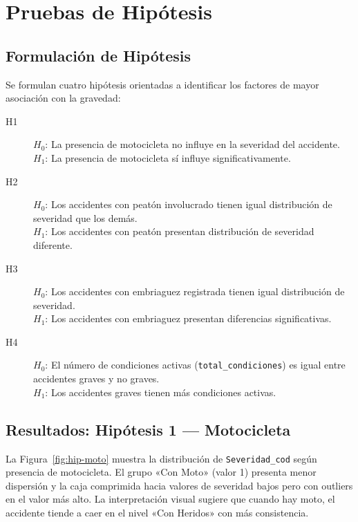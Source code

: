 \documentclass[11pt,a4paper]{article}
\begin{document}
\section{Pruebas de Hipótesis}

\subsection{Formulación de Hipótesis}

Se formulan cuatro hipótesis orientadas a identificar los factores de mayor asociación con
la gravedad:

\begin{description}
  \item[H1] $H_0$: La presencia de motocicleta no influye en la severidad del accidente.\\
            $H_1$: La presencia de motocicleta sí influye significativamente.
  \item[H2] $H_0$: Los accidentes con peatón involucrado tienen igual distribución de
            severidad que los demás.\\
            $H_1$: Los accidentes con peatón presentan distribución de severidad diferente.
  \item[H3] $H_0$: Los accidentes con embriaguez registrada tienen igual distribución de
            severidad.\\
            $H_1$: Los accidentes con embriaguez presentan diferencias significativas.
  \item[H4] $H_0$: El número de condiciones activas (\texttt{total\_condiciones}) es igual
            entre accidentes graves y no graves.\\
            $H_1$: Los accidentes graves tienen más condiciones activas.
\end{description}

\subsection{Resultados: Hipótesis 1 --- Motocicleta}

La Figura~\ref{fig:hip-moto} muestra la distribución de \texttt{Severidad\_cod} según
presencia de motocicleta. El grupo «Con Moto» (valor 1) presenta menor dispersión y la
caja comprimida hacia valores de severidad bajos pero con outliers en el valor más alto.
La interpretación visual sugiere que cuando hay moto, el accidente tiende a caer en el
nivel «Con Heridos» con más consistencia.
\end{document}
